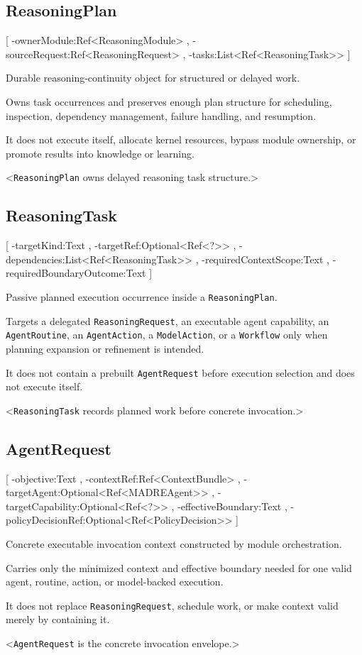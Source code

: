 \documentclass[11pt]{report}
\begin{document}
\subsection{ReasoningPlan}
[
	\UMLAt-ownerModule:Ref<ReasoningModule> ,
	\UMLAt-sourceRequest:Ref<ReasoningRequest> ,
	\UMLAt-tasks:List<Ref<ReasoningTask>>
]{%
	\item[] Durable reasoning-continuity object for structured or delayed work.
	\item[] Owns task occurrences and preserves enough plan structure for scheduling, inspection, dependency management, failure handling, and resumption.
	\item[] It does not execute itself, allocate kernel resources, bypass module ownership, or promote results into knowledge or learning.
}<\texttt{ReasoningPlan} owns delayed reasoning task structure.>

\subsection{ReasoningTask}
[
	\UMLAt-targetKind:Text ,
	\UMLAt-targetRef:Optional<Ref<?>> ,
	\UMLAt-dependencies:List<Ref<ReasoningTask>> ,
	\UMLAt-requiredContextScope:Text ,
	\UMLAt-requiredBoundaryOutcome:Text
]{%
	\item[] Passive planned execution occurrence inside a \texttt{ReasoningPlan}.
	\item[] Targets a delegated \texttt{ReasoningRequest}, an executable agent capability, an \texttt{AgentRoutine}, an \texttt{AgentAction}, a \texttt{ModelAction}, or a \texttt{Workflow} only when planning expansion or refinement is intended.
	\item[] It does not contain a prebuilt \texttt{AgentRequest} before execution selection and does not execute itself.
}<\texttt{ReasoningTask} records planned work before concrete invocation.>

\subsection{AgentRequest}
[
	\UMLAt-objective:Text ,
	\UMLAt-contextRef:Ref<ContextBundle> ,
	\UMLAt-targetAgent:Optional<Ref<MADREAgent>> ,
	\UMLAt-targetCapability:Optional<Ref<?>> ,
	\UMLAt-effectiveBoundary:Text ,
	\UMLAt-policyDecisionRef:Optional<Ref<PolicyDecision>>
]{%
	\item[] Concrete executable invocation context constructed by module orchestration.
	\item[] Carries only the minimized context and effective boundary needed for one valid agent, routine, action, or model-backed execution.
	\item[] It does not replace \texttt{ReasoningRequest}, schedule work, or make context valid merely by containing it.
}<\texttt{AgentRequest} is the concrete invocation envelope.>
\end{document}
